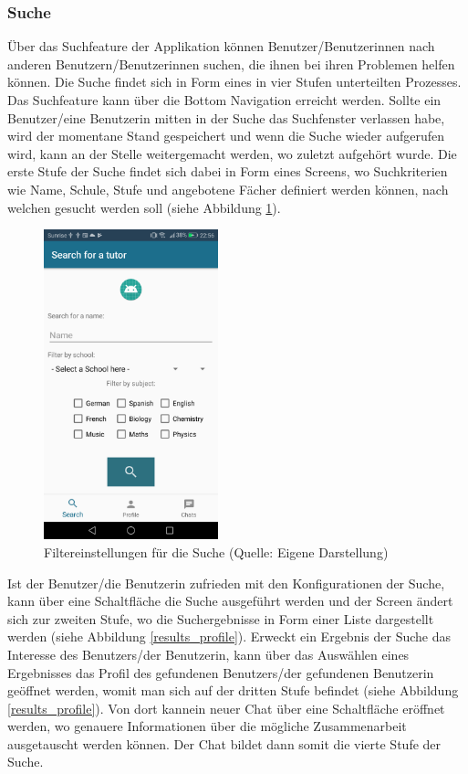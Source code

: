 \documentclass[../main.tex]{subfiles}
\begin{document}
\subsubsection*{Suche}
Über das Suchfeature der Applikation können Benutzer/Benutzerinnen nach anderen Benutzern/Benutzerinnen suchen, die ihnen bei ihren Problemen helfen können. Die Suche findet sich in Form eines in vier Stufen unterteilten Prozesses. Das Suchfeature kann über die Bottom Navigation erreicht werden. Sollte ein Benutzer/eine Benutzerin mitten in der Suche das Suchfenster verlassen habe, wird der momentane Stand gespeichert und wenn die Suche wieder aufgerufen wird, kann an der Stelle weitergemacht werden, wo zuletzt aufgehört wurde. Die erste Stufe der Suche findet sich dabei in Form eines Screens, wo Suchkriterien wie Name, Schule, Stufe und angebotene Fächer definiert werden können, nach welchen gesucht werden soll (siehe Abbildung \ref{searchOverview}).
\begin{figure} 
	\centering
	\includegraphics[width=0.45\textwidth]{./images/searchfilter.png}
	\caption{Filtereinstellungen für die Suche (Quelle: Eigene Darstellung)}
	\label{searchOverview}
\end{figure} 
Ist der Benutzer/die Benutzerin zufrieden mit den Konfigurationen der Suche, kann über eine Schaltfläche die Suche ausgeführt werden und der Screen ändert sich zur zweiten Stufe, wo die Suchergebnisse in Form einer Liste dargestellt werden (siehe Abbildung \ref{results_profile}). Erweckt ein Ergebnis der Suche das Interesse des Benutzers/der Benutzerin, kann über das Auswählen eines Ergebnisses das Profil des gefundenen Benutzers/der gefundenen Benutzerin geöffnet werden, womit man sich auf der dritten Stufe befindet (siehe Abbildung  \ref{results_profile}). Von dort kannein neuer Chat über eine Schaltfläche eröffnet werden, wo genauere Informationen über die mögliche Zusammenarbeit ausgetauscht werden können. Der Chat bildet dann somit die vierte Stufe der Suche.
\end{document}
